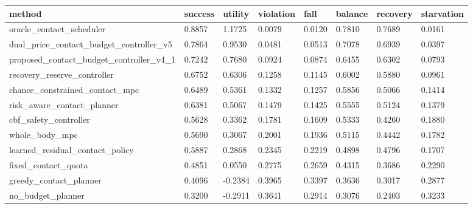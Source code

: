 \begin{tabular}{llllllll}
\toprule
method & success & utility & violation & fall & balance & recovery & starvation \\
\midrule
oracle\_contact\_scheduler & 0.8857 & 1.1725 & 0.0079 & 0.0120 & 0.7810 & 0.7689 & 0.0161 \\
dual\_price\_contact\_budget\_controller\_v5 & 0.7864 & 0.9530 & 0.0481 & 0.0513 & 0.7078 & 0.6939 & 0.0397 \\
proposed\_contact\_budget\_controller\_v4\_1 & 0.7242 & 0.7680 & 0.0924 & 0.0874 & 0.6455 & 0.6302 & 0.0793 \\
recovery\_reserve\_controller & 0.6752 & 0.6306 & 0.1258 & 0.1145 & 0.6002 & 0.5880 & 0.0961 \\
chance\_constrained\_contact\_mpc & 0.6489 & 0.5361 & 0.1332 & 0.1257 & 0.5856 & 0.5066 & 0.1414 \\
risk\_aware\_contact\_planner & 0.6381 & 0.5067 & 0.1479 & 0.1425 & 0.5555 & 0.5124 & 0.1379 \\
cbf\_safety\_controller & 0.5628 & 0.3362 & 0.1781 & 0.1609 & 0.5333 & 0.4260 & 0.1880 \\
whole\_body\_mpc & 0.5690 & 0.3067 & 0.2001 & 0.1936 & 0.5115 & 0.4442 & 0.1782 \\
learned\_residual\_contact\_policy & 0.5887 & 0.2868 & 0.2345 & 0.2219 & 0.4898 & 0.4796 & 0.1707 \\
fixed\_contact\_quota & 0.4851 & 0.0550 & 0.2775 & 0.2659 & 0.4315 & 0.3686 & 0.2290 \\
greedy\_contact\_planner & 0.4096 & -0.2384 & 0.3965 & 0.3397 & 0.3636 & 0.3017 & 0.2877 \\
no\_budget\_planner & 0.3200 & -0.2911 & 0.3641 & 0.2914 & 0.3076 & 0.2403 & 0.3233 \\
\bottomrule
\end{tabular}
